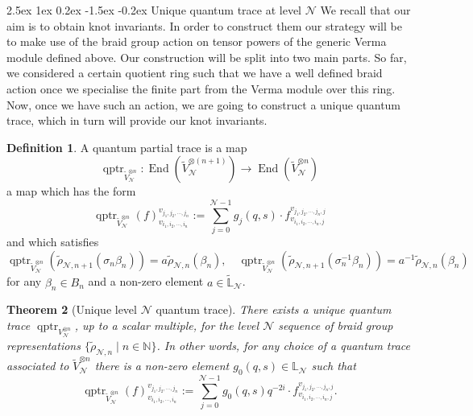 \documentclass[reqno,a4paper,11pt]{amsart}
\makeatletter
\numberwithin{equation}{section}
\numberwithin{figure}{section}
\theoremstyle{definition}
\newtheorem{defn}{Definition}[section]
\theoremstyle{plain}
\newtheorem{thm}[defn]{Theorem}
\renewcommand*{\subsection}{\@startsection{subsection}{2}{\z@}%
	{2.5ex \@plus 1ex \@minus 0.2ex}%
	{-1.5ex \@plus -0.2ex}%
	{\normalfont\normalsize\bfseries}}
\newcommand{\N}{\mathbb N}
\newcommand{\qptr}{\operatorname{qptr}}
\newcommand{\Li}{{\mathbb L}}
\newcommand{\cN}{\mathcal{N}}
\makeatother
\begin{document}
\subsection{Unique quantum trace at level $\cN$} 
We recall that our aim is to obtain knot invariants. In order to construct them our strategy will be to make use of the braid group action on tensor powers of the generic Verma module defined above. Our construction will be split into two main parts. {So far, we considered} a certain quotient ring such that we have a well defined braid action once we specialise the finite part from the Verma module over this ring. Now, once we have such an action, we are going to construct a unique quantum trace, which in turn will provide our knot invariants. 
%
\begin{defn}
A quantum partial trace is a map
$$
\qptr_{\widetilde{V}_{\cN}^{\otimes n}}:\operatorname{End}(\widetilde{V}_{\cN}^{\otimes (n+1)})\rightarrow \operatorname{End}(\widetilde{V}_{\cN}^{\otimes n})
$$
%
a map which has the form
\[
\qptr_{\widetilde{V}_{\cN}^{\otimes n}}(f)_{v_{i_1,i_2, \cdots, i_n}}^{v_{j_1,j_2, \cdots, j_n}}
:=\sum_{j=0}^{\cN-1}
g_j(q, s) \cdot f_{v_{i_1,i_2, \cdots, i_n,j}}^{v_{j_1,j_2, \cdots, j_n,j}}
\]
%
and which satisfies
%
\begin{equation}
\qptr_{\widetilde{V}_{\cN}^{\otimes n}}(\widetilde\rho_{\cN,{n+1}}(\sigma_n\beta_n)) 
=
a \widetilde\rho_{\cN,n}(\beta_n), \quad
\qptr_{\widetilde{V}_{\cN}^{\otimes n}}(\widetilde\rho_{\cN,{n+1}}(\sigma_n^{-1}\beta_n) )
=
a^{-1} \widetilde\rho_{\cN,n}(\beta_n)
\label{eq:qtcondition}
\end{equation}
%
 for {any }$\beta_n \in B_n$ and a non-zero element $a \in \widetilde\Li_\cN$.  
\end{defn}
%
\begin{thm}[Unique level $\cN$ quantum trace]\label{thm:uqtr1}
There exists a unique quantum trace $\qptr_{V_{\cN}^{\otimes n}}$, up to a scalar multiple, 
for the level $\cN$ sequence of braid group representations 
  $
 \{\widetilde\rho_{\cN,n}\mid n \in \N \}
 $.
 In other words, {for any choice of a quantum trace associated to $\widetilde{V}_{\cN}^{\otimes n}$} there is a non-zero element $g_0(q, s)\in \Li_\cN$ such that
\[
\qptr_{\widetilde{V}_{\cN}^{\otimes n}}(f)_{v_{i_1,i_2, \cdots, i_n}}^{v_{j_1,j_2, \cdots, j_n}}
:=\sum_{j=0}^{\cN-1}
g_0(q, s)q^{-2i} \cdot f_{v_{i_1,i_2, \cdots, i_n,j}}^{v_{j_1,j_2, \cdots, j_n,j}}.
\]
\end{thm}
%
\end{document}
